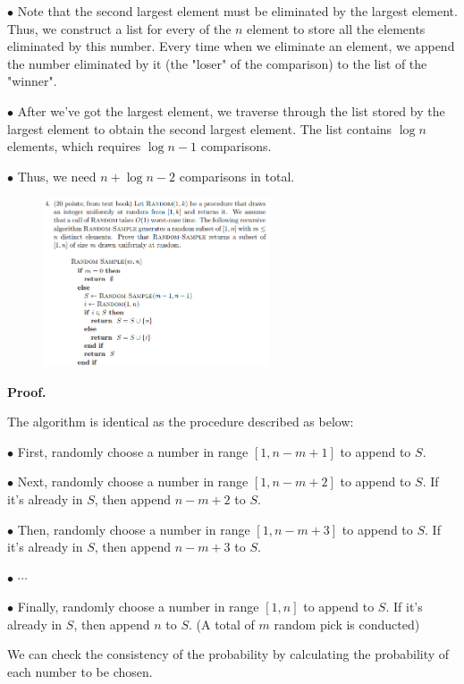 \documentclass[10pt]{article}
\begin{document}
$\bullet$ Note that the second largest element must be eliminated by the largest element. Thus, we construct a list for every of the $n$ element to store all the elements eliminated by this number. Every time when we eliminate an element, we append the number eliminated by it (the "loser" of the comparison) to the list of the "winner".

$\bullet$ After we've got the largest element, we traverse through the list stored by the largest element to obtain the second largest element. The list contains $\log n$ elements, which requires $\log n - 1$ comparisons.

$\bullet$ Thus, we need $n + \log n - 2$ comparisons in total.

\newpage

\begin{figure}[h]
	\centering
	\includegraphics[width=0.6\textwidth]{hw2-4}
\end{figure}

\textbf{Proof.}

The algorithm is identical as the procedure described as below:

$\bullet$ First, randomly choose a number in range $[1, n-m+1]$ to append to $S$.

$\bullet$ Next, randomly choose a number in range $[1, n-m+2]$ to append to $S$. If it's already in $S$, then append $n-m+2$ to $S$.

$\bullet$ Then, randomly choose a number in range $[1, n-m+3]$ to append to $S$. If it's already in $S$, then append $n-m+3$ to $S$.

$\bullet$ $\cdots$

$\bullet$ Finally, randomly choose a number in range $[1, n]$ to append to $S$. If it's already in $S$, then append $n$ to $S$. (A total of $m$ random pick is conducted)

We can check the consistency of the probability by calculating the probability of each number to be chosen.
\end{document}
